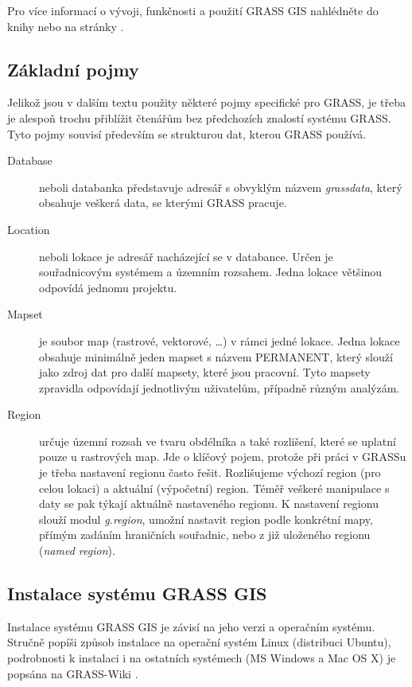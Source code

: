 \documentclass[a4paper,12pt,draft]{article}
\begin{document}
Pro více informací o vývoji, funkčnosti a použití GRASS GIS nahlédněte
do knihy \cite{grass_gis} nebo na stránky \cite{grass_page}.

\subsection{Základní pojmy}
\label{sec:grass:pojmy}
Jelikož jsou v dalším textu použity některé pojmy specifické pro GRASS,
je třeba je alespoň trochu přiblížit čtenářům bez předchozích
znalostí systému GRASS. Tyto pojmy souvisí především se strukturou dat,
kterou GRASS používá.

\begin{description}
\item[Database] neboli databanka představuje adresář s obvyklým názvem
\emph{grassdata}, který obsahuje veškerá data, se kterými GRASS pracuje.
\item [Location] neboli lokace je adresář nacházející se v
databance. Určen je souřadnicovým systémem a územním rozsahem. Jedna
lokace většinou odpovídá jednomu projektu.
\item [Mapset] je soubor map (rastrové, vektorové, \ldots) v rámci
jedné lokace. Jedna lokace obsahuje minimálně jeden mapset s názvem
PERMANENT, který  slouží jako zdroj dat pro další mapsety, které jsou
pracovní. Tyto mapsety zpravidla odpovídají jednotlivým uživatelům,
případně různým analýzám.
\item [Region] určuje územní rozsah ve tvaru obdélníka a také
rozlišení, které se uplatní pouze u rastrových map. Jde o klíčový
pojem, protože při práci v GRASSu je třeba nastavení regionu často
řešit.  Rozlišujeme výchozí region (pro celou lokaci) a aktuální
(výpočetní) region. Téměř veškeré manipulace s daty se pak
týkají aktuálně nastaveného regionu. K nastavení regionu slouží
modul \emph{g.region}, umožní nastavit region podle konkrétní mapy,
přímým zadáním hraničních souřadnic, nebo z již uloženého regionu
(\emph{named region}).
 \end{description}

\subsection{Instalace systému GRASS GIS}
Instalace systému GRASS GIS je závisí na jeho verzi a operačním
systému. Stručně popíši způsob instalace na operační systém Linux
(distribuci Ubuntu), podrobnosti k instalaci i na ostatních systémech
(MS Windows a Mac OS X) je popsána na GRASS-Wiki \cite{instalace}.
\end{document}
